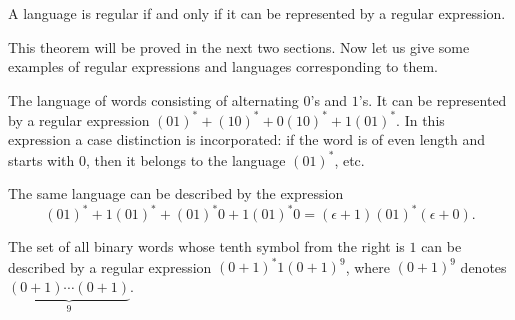 \begin{page}
\setcounter{section}{2}
\setcounter{subsection}{1}
\setcounter{dfn}{3}
\label{portion:1080}

\begin{thm}
\label{thm:RegLangExpr}
A language is regular if and only if it can be represented by a regular expression.
\end{thm}

\end{page}

\begin{page}
\setcounter{section}{2}
\setcounter{subsection}{1}
\setcounter{dfn}{3}
\label{portion:1081}


This theorem will be proved in the next two sections.
Now let us give some examples of regular expressions and languages corresponding to them.


\end{page}

\begin{page}
\setcounter{section}{2}
\setcounter{subsection}{1}
\setcounter{dfn}{4}
\label{portion:1083}

\begin{exl}
The language of words consisting of alternating $0$'s and $1$'s.
It can be represented by a regular expression $(01)^* + (10)^* + 0(10)^* + 1(01)^*$.
In this expression a case distinction is incorporated: if the word is of even length and starts with $0$,
then it belongs to the language $(01)^*$, etc.

The same language can be described by the expression
\[
(01)^* + 1(01)^* + (01)^*0 + 1(01)^*0 = (\epsilon + 1)(01)^*(\epsilon + 0).
\]
\end{exl}

\end{page}

\begin{page}
\setcounter{section}{2}
\setcounter{subsection}{1}
\setcounter{dfn}{5}
\label{portion:1086}

\begin{exl}
The set of all binary words whose tenth symbol from the right is $1$ can be described by a regular expression $(0+1)^* 1 (0+1)^9$,
where $(0+1)^9$ denotes $\underbrace{(0+1)\cdots (0+1)}_{9}$.
\end{exl}

\end{page}

